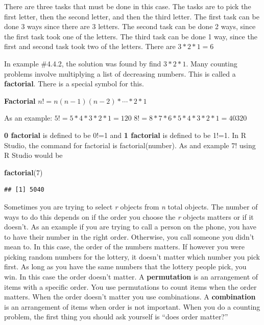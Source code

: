 \documentclass[
]{book}
\newenvironment{Shaded}{\begin{snugshade}}{\end{snugshade}}
\newcommand{\DecValTok}[1]{\textcolor[rgb]{0.00,0.00,0.81}{#1}}
\newcommand{\KeywordTok}[1]{\textcolor[rgb]{0.13,0.29,0.53}{\textbf{#1}}}
\newcommand{\NormalTok}[1]{#1}
\begin{document}
There are three tasks that must be done in this case. The tasks are to pick the first letter, then the second letter, and then the third letter. The first task can be done 3 ways since there are 3 letters. The second task can be done 2 ways, since the first task took one of the letters. The third task can be done 1 way, since the first and second task took two of the letters. There are \(3*2*1=6\)

In example \#4.4.2, the solution was found by find \(3*2*1\). Many counting problems involve multiplying a list of decreasing numbers. This is called a \textbf{factorial}. There is a special symbol for this.

\textbf{Factorial}
\(n!=n(n-1)(n-2)*\cdots*2*1\)

As an example:
\(5!=5*4*3*2*1=120\)
\(8!=8*7*6*5*4*3*2*1=40320\)

\textbf{0 factorial} is defined to be 0!=1 and \textbf{1 factorial} is defined to be 1!=1. In R Studio, the command for factorial is factorial(number). As and example 7! using R Studio would be

\begin{Shaded}
\begin{Highlighting}[]
\KeywordTok{factorial}\NormalTok{(}\DecValTok{7}\NormalTok{)}
\end{Highlighting}
\end{Shaded}

\begin{verbatim}
## [1] 5040
\end{verbatim}

Sometimes you are trying to select \emph{r} objects from \emph{n} total objects. The number of ways to do this depends on if the order you choose the \emph{r} objects matters or if it doesn't. As an example if you are trying to call a person on the phone, you have to have their number in the right order. Otherwise, you call someone you didn't mean to. In this case, the order of the numbers matters. If however you were picking random numbers for the lottery, it doesn't matter which number you pick first. As long
as you have the same numbers that the lottery people pick, you win. In this case the order doesn't matter. A \textbf{permutation} is an arrangement of items with a specific order. You use permutations to count items when the order matters. When the order doesn't matter you use combinations. A \textbf{combination} is an arrangement of items when order is not important. When you do a counting problem, the first thing you should ask yourself is ``does order matter?''
\end{document}
